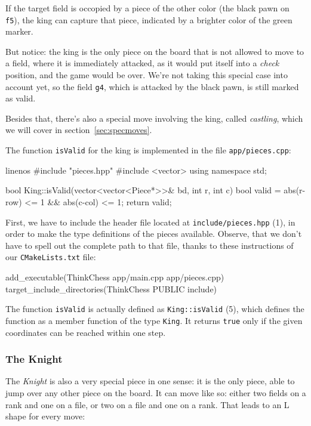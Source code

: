 If the target field is occopied by a piece of the other color (the black pawn on \texttt{f5}),
the king can capture that piece, indicated by a brighter color of the green marker.

But notice: the king is the only piece on the board that is not allowed to move to a field,
where it is immediately attacked, as it would put
itself into a \emph{check} position, and the game would be over.
We're not taking this special case into account yet, so the field \texttt{g4},
which is attacked by the black pawn, is still marked as valid.

Besides that, there's also a special move involving the king, called \emph{castling},
which we will cover in section~\ref{sec:specmoves}.

The function \texttt{isValid} for the king is implemented in the file
\texttt{app/pieces.cpp}:

\begin{cpp*}{linenos}
#include "pieces.hpp"
#include <vector>
using namespace std;

bool King::isValid(vector<vector<Piece*>>& bd, int r, int c) {
  bool valid = abs(r-row) <= 1 && abs(c-col) <= 1;
  return valid;
}
\end{cpp*}

First, we have to include the header file located at \texttt{include/pieces.hpp} (1),
in order to make the type definitions of the pieces available.
Observe, that we don't have to spell out the complete path to that file, thanks to these
instructions of our \texttt{CMakeLists.txt} file:

\begin{cpp}
add_executable(ThinkChess app/main.cpp app/pieces.cpp)
target_include_directories(ThinkChess PUBLIC include)
\end{cpp}

The function \texttt{isValid} is actually defined as
\texttt{King::isValid} (5), which defines the function as a member function of the
type \texttt{King}.
It returns \texttt{true} only if the given coordinates can be reached within one step.

\subsubsection{The Knight}
The \emph{Knight} is also a very special piece in one sense: it is the only piece, able to
jump over any other piece on the board.
It can move like so: either two fields on a rank and one on a file, or two on a file and one on
a rank.
That leads to an L shape for every move:

